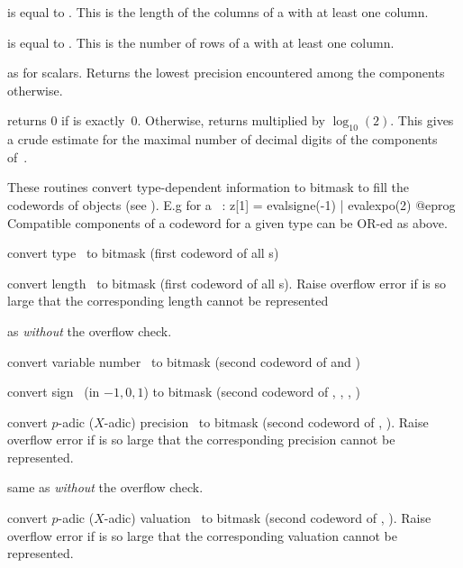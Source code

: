  is equal to . This is the length
of the columns of a  with at least one column.

 is equal to . This is the number
of rows of a  with at least one column.

 as  for scalars. Returns the
lowest precision encountered among the components otherwise.

 returns 0 if  is exactly~0. Otherwise,
returns  multiplied by $\log_{10}(2)$. This gives a crude
estimate for the maximal number of decimal digits of the components
of~.

These routines convert type-dependent information to bitmask to fill the
codewords of  objects (see ). E.g for a
~:
\bprog
  z[1] = evalsigne(-1) | evalexpo(2)
@eprog
Compatible components of a codeword for a given type can be OR-ed as above.

 convert type~ to bitmask (first
codeword of all s)

 convert length~ to bitmask (first
codeword of all s). Raise overflow error if  is so large that
the corresponding length cannot be represented

 as  \emph{without} the overflow
check.

 convert variable number~ to bitmask
(second codeword of  and )

 convert sign~ (in $-1,0,1$) to bitmask
(second codeword of , , , )

 convert $p$-adic ($X$-adic) precision~
to bitmask (second codeword of , ). Raise overflow error
if  is so large that the corresponding precision cannot be
represented.

 same as  \emph{without} the
overflow check.

 convert $p$-adic ($X$-adic) valuation~ to
bitmask (second codeword of , ). Raise overflow error if
 is so large that the corresponding valuation cannot be represented.

